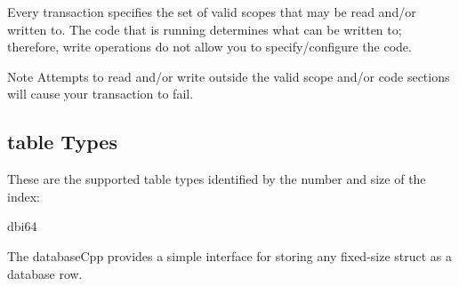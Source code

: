 Every transaction specifies the set of valid scopes that may be read and/or written to. The code that is running determines what can be written to; therefore, write operations do not allow you to specify/configure the code.

\begin{DoxyNote}{Note}
Attempts to read and/or write outside the valid scope and/or code sections will cause your transaction to fail.
\end{DoxyNote}
\hypertarget{group__database_tabletypes}{}\subsection{table Types}\label{group__database_tabletypes}
These are the supported table types identified by the number and size of the index\+:


\begin{DoxyEnumerate}
\item dbi64
\end{DoxyEnumerate}

The database\+Cpp provides a simple interface for storing any fixed-\/size struct as a database row. 